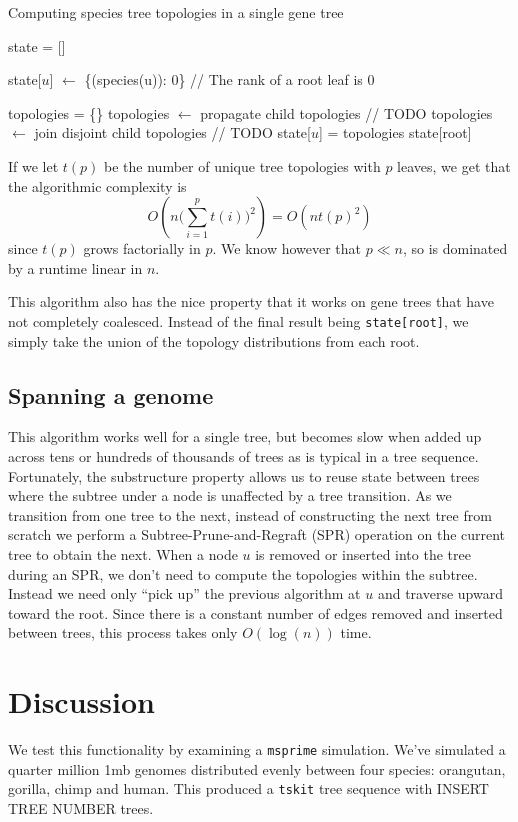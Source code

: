 \documentclass{article}
\newcommand{\tskit}{{\texttt{tskit}}}
\newcommand{\msprime}{{\texttt{msprime}}}
\begin{document}
\begin{algorithm}
\label{alg:dp_alg}
    \caption{Computing species tree topologies in a single gene tree}
    \begin{algorithmic}
        \State state = []

        \State state[$u$] $\leftarrow$ \{(species(u)): 0\} // The rank of a root leaf is 0
        \EndFor

            \State topologies = \{\}
            \State topologies $\leftarrow$ propagate child topologies // TODO
            \State topologies $\leftarrow$ join disjoint child topologies // TODO
            \State state[$u$] = topologies
        \EndFor
        \State \Return state[root]
    \end{algorithmic}
\end{algorithm}
If we let $t(p)$ be the number of unique tree topologies with $p$ leaves,
we get that the algorithmic complexity is
\[
    O(n \big(\sum_{i=1}^p t(i)\big)^2) = O(n t(p)^2)
\]
since $t(p)$ grows factorially in $p$. We know however that $p \ll n$, so is
dominated by a runtime linear in $n$.

This algorithm also has the nice property that it works on gene trees
that have not completely coalesced. Instead of the final result being
\texttt{state[root]}, we simply take the union of the topology distributions
from each root.

\subsection{Spanning a genome}
This algorithm works well for a single tree, but becomes slow when added up
across tens or hundreds of thousands of trees as is typical in a tree sequence.
Fortunately, the substructure property allows us to reuse state between trees
where the subtree under a node is unaffected by a tree transition.
As we transition from one tree to the next, instead of constructing
the next tree from scratch we perform a Subtree-Prune-and-Regraft (SPR) operation
on the current tree to obtain the next.
When a node $u$ is removed or inserted into the tree during an SPR, we don't
need to compute the topologies within the subtree.
Instead we need only ``pick up'' the previous algorithm at $u$ and traverse
upward toward the root.
Since there is a constant number of edges removed and inserted between trees,
this process takes only $O(\log(n))$ time.

\section{Discussion}
We test this functionality by examining a \msprime{} simulation. We've simulated
a quarter million 1mb genomes distributed evenly between four species: orangutan,
gorilla, chimp and human. This produced a \tskit{} tree sequence with
INSERT TREE NUMBER trees.
\end{document}

